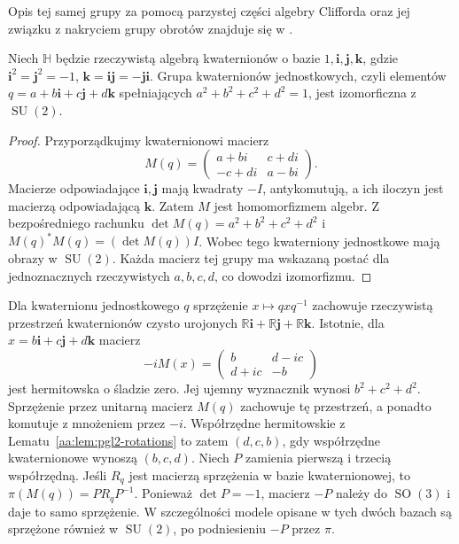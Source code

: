 Opis tej samej grupy za pomocą parzystej części algebry Clifforda oraz jej związku z nakryciem grupy obrotów znajduje się w .

\begin{stwierdzenie}
\label{aa:st:binary-quaternions}
Niech $\mathbb H$ będzie rzeczywistą algebrą
kwaternionów o bazie $1,\mathbf i,\mathbf j,\mathbf k$,
gdzie $\mathbf i^2=\mathbf j^2=-1$,
$\mathbf k=\mathbf i\mathbf j=-\mathbf j\mathbf i$.
Grupa kwaternionów jednostkowych, czyli elementów
$q=a+b\mathbf i+c\mathbf j+d\mathbf k$ spełniających
$a^2+b^2+c^2+d^2=1$, jest izomorficzna
z $\operatorname{SU}(2)$.
\end{stwierdzenie}
\begin{proof}
Przyporządkujmy kwaternionowi macierz
\[
 M(q)=
 \begin{pmatrix}
 a+bi & c+di\\
 -c+di & a-bi
 \end{pmatrix}.
\]
Macierze odpowiadające $\mathbf i,\mathbf j$
mają kwadraty $-I$, antykomutują, a ich iloczyn
jest macierzą odpowiadającą $\mathbf k$.
Zatem $M$ jest homomorfizmem algebr.
Z bezpośredniego rachunku
$\det M(q)=a^2+b^2+c^2+d^2$
i $M(q)^*M(q)=(\det M(q))I$.
Wobec tego kwaterniony jednostkowe mają obrazy
w $\operatorname{SU}(2)$. Każda macierz tej grupy
ma wskazaną postać dla jednoznacznych rzeczywistych
$a,b,c,d$, co dowodzi izomorfizmu.
\end{proof}

Dla kwaternionu jednostkowego $q$ sprzężenie
$x\mapsto qxq^{-1}$ zachowuje rzeczywistą przestrzeń
kwaternionów czysto urojonych
$\mathbb R\mathbf i+\mathbb R\mathbf j+\mathbb R\mathbf k$.
Istotnie, dla $x=b\mathbf i+c\mathbf j+d\mathbf k$
macierz
\[
 -iM(x)=
 \begin{pmatrix}b&d-ic\\d+ic&-b\end{pmatrix}
\]
jest hermitowska o śladzie zero. Jej ujemny wyznacznik
wynosi $b^2+c^2+d^2$. Sprzężenie przez unitarną macierz
$M(q)$ zachowuje tę przestrzeń, a ponadto komutuje
z mnożeniem przez $-i$.
Współrzędne hermitowskie z Lematu~\ref{aa:lem:pgl2-rotations}
to zatem $(d,c,b)$, gdy współrzędne kwaternionowe
wynoszą $(b,c,d)$. Niech $P$ zamienia pierwszą
i trzecią współrzędną. Jeśli $R_q$ jest macierzą
sprzężenia w bazie kwaternionowej, to
$\pi(M(q))=PR_qP^{-1}$. Ponieważ $\det P=-1$,
macierz $-P$ należy do $\operatorname{SO}(3)$ i daje
to samo sprzężenie. W szczególności modele opisane
w tych dwóch bazach są sprzężone również w
$\operatorname{SU}(2)$, po podniesieniu $-P$ przez $\pi$.

